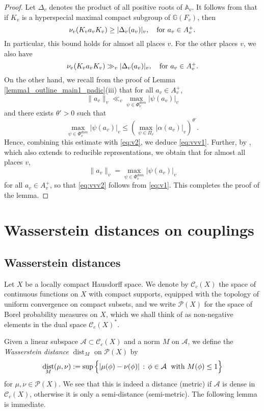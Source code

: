 \documentclass[11pt,reqno,a4paper]{amsart}
\numberwithin{equation}{section}
\newcommand{\cA}{\mathcal{A}}
\newcommand{\cC}{\mathcal{C}}
\newcommand{\cP}{\mathcal{P}}
\newcommand{\bA}{\mathbb{A}}
\newcommand{\bG}{\mathbb{G}}
\DeclareMathOperator{\dist}{dist}
\theoremstyle{theorem}
\theoremstyle{definition}
\begin{document}
\begin{proof}
Let $\Delta_v$ denotes the product of all positive roots of $\bA_v$.
It follows from \cite[3.2.15]{mac} that if $K_v$ is a hyperspecial maximal compact
subgroup of $\bG(F_v)$, then 
\begin{equation}
\label{eq:v1}
\nu_v(K_va_vK_v)\ge |\Delta_v(a_v)|_v,\quad \hbox{for $a_v\in A_v^+$.}
\end{equation}
In particular, this bound holds for almost all places $v$.
For the other places $v$, we also have
\begin{equation}
\label{eq:v2}
\nu_v(K_va_vK_v)\gg_v |\Delta_v(a_v)|_v,\quad \hbox{for $a_v\in A_v^+$.}
\end{equation}
On the other hand, we recall from the proof of Lemma \ref{lemma1_outline_main1_padic}(iii)
that for all $a_v\in A_v^+$,
$$
\|a_v\|_v\ll_v \max_{\psi\in \Phi_v^{dom}} |\psi(a_v)|_v
$$
and there exists $\theta'>0$ such that
$$
\max_{\psi\in \Phi_v^{dom}} |\psi(a_v)|_v \le \left(\max_{\psi\in \Pi_v} |\alpha(a_v)|_v\right)^{\theta'}.
$$
Hence, combining this estimate with \eqref{eq:v2}, we deduce \eqref{eq:vvv1}.
Further, by \cite[Lemma~6.4]{STBT}, which also extends to reducible representations,
we obtain that for almost all places $v$, 
$$
\|a_v\|_v =\max_{\psi\in \Phi_v^{dom}} |\psi(a_v)|_v
$$
for all $a_v\in A_v^+$,
so that \eqref{eq:vvv2} follows from \eqref{eq:v1}. This completes the proof of the lemma.
\end{proof}


\section{Wasserstein distances on couplings}
\label{sec:wasserstein}

\subsection{Wasserstein distances}

Let $X$ be a locally compact Hausdorff space. We denote by $\cC_c(X)$ the space of continuous
functions on $X$ with compact supports, equipped with the topology of uniform convergence on compact subsets, 
and we write $\cP(X)$ for the space of Borel probability measures on $X$, which we shall think of as non-negative elements in the dual space $\cC_c(X)^*$.

Given a linear subspace $\cA \subset\cC_c(X)$ and a norm $M$ on $\cA$, we define the \emph{Wasserstein distance}
$\dist_M$ on $\cP(X)$ by
\[
\dist_M(\mu,\nu)
:= 
\sup\Big\{
| \mu(\phi) - \nu(\phi) | \, : \, \phi \in \cA\;\hbox{ with } M(\phi) \leq 1 \Big\}
\]
for $\mu, \nu \in \cP(X)$. 
We see that this is indeed a distance (metric) if $\cA$ is dense in $\cC_c(X)$, otherwise it is only a semi-distance (semi-metric). The following lemma is immediate. 
\end{document}
